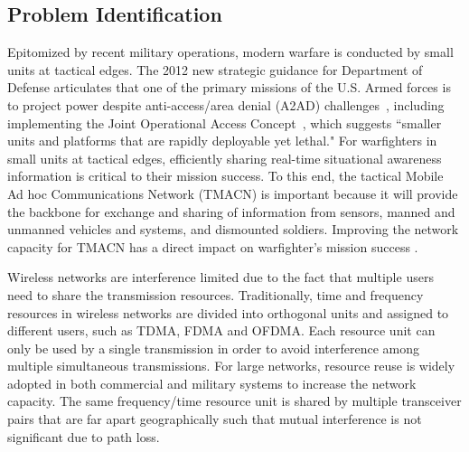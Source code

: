\documentclass[letterpaper,11pt]{article}
\begin{document}
\subsection{Problem Identification}
Epitomized by recent military operations, modern warfare is conducted by small units at tactical edges. The 2012 new strategic guidance for Department of Defense articulates that one of the primary missions of the U.S. Armed forces is to project power despite anti-access/area denial (A2AD) challenges~\cite{DoD:strategy2012}, including implementing the Joint Operational Access Concept~\cite{DoD:JOAC}, which suggests ``smaller units and platforms that are rapidly deployable yet lethal." For warfighters in small units at tactical edges, efficiently sharing real-time situational awareness information is critical to their mission success. To this end, the tactical Mobile Ad hoc Communications Network (TMACN) is important because it will provide the backbone for exchange and sharing of information from sensors, manned and unmanned vehicles and systems, and dismounted soldiers. Improving the network capacity for TMACN has a direct impact on warfighter's mission success . 


Wireless networks are interference limited due to the fact that multiple users need to share the transmission resources. Traditionally, time and frequency resources in wireless networks are divided into orthogonal units and assigned to different users, such as TDMA, FDMA and OFDMA. Each resource unit can only be used by a single transmission in order to avoid interference among multiple simultaneous transmissions. For large networks, resource reuse is widely adopted in both commercial and military systems to increase the network capacity. The same frequency/time resource unit is shared by multiple transceiver pairs that are far apart geographically such that mutual interference is not significant due to path loss. 
\end{document}
